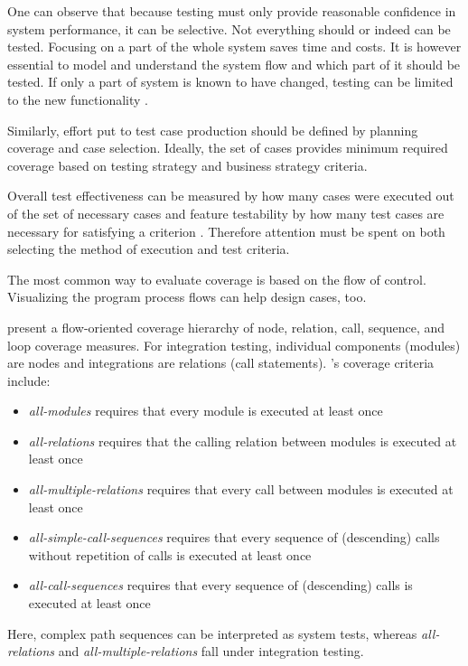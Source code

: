 \documentclass[12pt,a4paper,oneside,pdftex]{report}
\begin{document}
One can observe that because testing must only provide reasonable confidence in system performance, it can be selective. Not everything should or indeed can be tested. Focusing on a part of the whole system saves time and costs. It is however essential to model and understand the system flow and which part of it should be tested. If only a part of system is known to have changed, testing can be limited to the new functionality \citep{bhuyan2012survey}. 

Similarly, effort put to test case production should be defined by planning coverage and case selection. Ideally, the set of cases provides minimum required coverage based on testing strategy and business strategy criteria. 

Overall test effectiveness can be measured by how many cases were executed out of the set of necessary cases and feature testability by how many test cases are necessary for satisfying a criterion \citep{linnenkugel1990test}. Therefore attention must be spent on both selecting the method of execution and test criteria. 

The most common way to evaluate coverage is based on the flow of control. Visualizing the program process flows can help design cases, too. \citep{burnstein2003practical} 

\citet{linnenkugel1990test} present a flow-oriented coverage hierarchy of node, relation, call, sequence, and loop coverage measures. For integration testing, individual components (modules) are nodes and integrations are relations (call statements). \citeauthor{linnenkugel1990test}'s \citeyearpar{linnenkugel1990test} coverage criteria include:
\begin{itemize}
\item \emph{all-modules} requires that every module is executed at least once 
\item \emph{all-relations} requires that the calling relation between modules is executed at least once
\item \emph{all-multiple-relations} requires that every call between modules is executed at least once
\item \emph{all-simple-call-sequences} requires that every sequence of (descending) calls without repetition of calls is executed at least once
\item \emph{all-call-sequences} requires that every sequence of (descending) calls is executed at least once
\end{itemize}
Here, complex path sequences can be interpreted as system tests, whereas \emph{all-relations} and \emph{all-multiple-relations} fall under integration testing.
\end{document}
